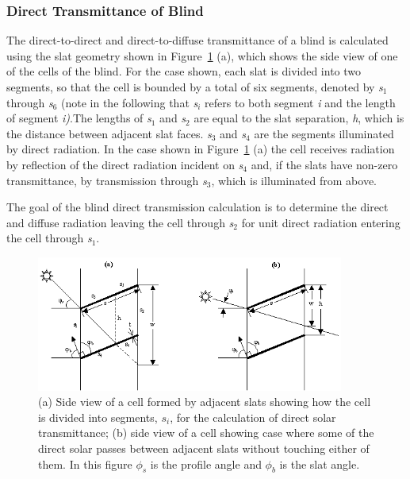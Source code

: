 \subsubsection{Direct Transmittance of Blind}\label{direct-transmittance-of-blind}

The direct-to-direct and direct-to-diffuse transmittance of a blind is calculated using the slat geometry shown in Figure~\ref{fig:a-side-view-of-a-cell-formed-by-adjacent} (a), which shows the side view of one of the cells of the blind. For the case shown, each slat is divided into two segments, so that the cell is bounded by a total of six segments, denoted by \emph{s\(_{1}\)} through \emph{s\(_{6}\)} (note in the following that \emph{s\(_{i}\)} refers to both segment \emph{i} and the length of segment \emph{i)}.The lengths of \emph{s\(_{1}\)} and \emph{s\(_{2}\)} are equal to the slat separation, \emph{h}, which is the distance between adjacent slat faces. \emph{s\(_{3}\)} and \emph{s\(_{4}\)} are the segments illuminated by direct radiation. In the case shown in Figure~\ref{fig:a-side-view-of-a-cell-formed-by-adjacent} (a) the cell receives radiation by reflection of the direct radiation incident on \emph{s\(_{4}\)} and, if the slats have non-zero transmittance, by transmission through \emph{s\(_{3}\)}, which is illuminated from above.

The goal of the blind direct transmission calculation is to determine the direct and diffuse radiation leaving the cell through \emph{s\(_{2}\)} for unit direct radiation entering the cell through \emph{s\(_{1}\)}.

\begin{figure}[hbtp] %
\centering
\includegraphics[width=0.9\textwidth, height=0.9\textheight, keepaspectratio=true]{media/image1034.png}
\caption{(a) Side view of a cell formed by adjacent slats showing how the cell is divided into segments, \(s_i\),  for the calculation of direct solar transmittance; (b) side view of a cell showing case where some of the direct solar passes between adjacent slats without touching either of them. In this figure \(\phi_s\) is the profile angle and \(\phi_b\) is the slat angle. \label{fig:a-side-view-of-a-cell-formed-by-adjacent}}
\end{figure}

